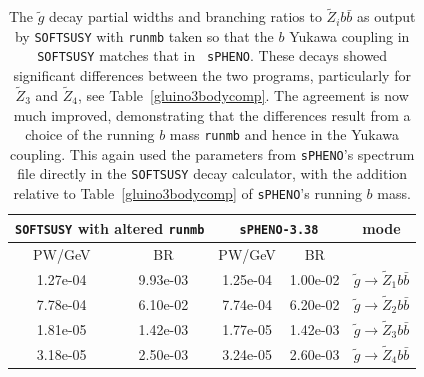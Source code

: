 \documentclass[final,3p,times,pdflatex]{elsarticle}
\def\code#1{{\tt #1}}
\begin{document}
\begin{center}
\begin{table}
\centering
\begin{tabular}{|c|c|c|c|c|} \hline
\multicolumn{2}{|C{3.0cm}|}{{\tt SOFTSUSY} with altered {\tt runmb}} & \multicolumn{2}{C{3.0cm}|}{{\tt sPHENO-3.38}} & mode \\ \hline
PW/GeV & BR & PW/GeV & BR & \\ \hline
1.27e-04 & 9.93e-03 & 1.25e-04 & 1.00e-02 & $\tilde{g} \rightarrow \tilde{Z}_1 b \bar{b}$ \\ \hline
7.78e-04 & 6.10e-02 & 7.74e-04 & 6.20e-02 & $\tilde{g} \rightarrow \tilde{Z}_2 b \bar{b}$ \\ \hline
1.81e-05 & 1.42e-03 & 1.77e-05 & 1.42e-03 & $\tilde{g} \rightarrow \tilde{Z}_3 b \bar{b}$ \\ \hline
3.18e-05 & 2.50e-03 & 3.24e-05 & 2.60e-03 & $\tilde{g} \rightarrow \tilde{Z}_4 b \bar{b}$ \\  \hline
\end{tabular}
\caption{The $\tilde{g}$ decay partial widths and branching ratios to
  $\tilde{Z}_i b \bar{b}$ as output by {\tt SOFTSUSY} with \code{runmb} taken
  so that the $b$ Yukawa coupling in {\tt SOFTSUSY} matches that in {\tt
    sPHENO}. These decays showed significant differences between the two
  programs, particularly for $\tilde{Z}_3$ and $\tilde{Z}_4$, see
  Table~\ref{gluino3bodycomp}. The agreement is now much improved,
  demonstrating that the differences result from a choice of the running $b$
  mass \code{runmb} and hence in the Yukawa coupling. This again used the
  parameters from {\tt sPHENO}'s spectrum file directly in the {\tt SOFTSUSY}
  decay calculator, with the addition relative to Table~\ref{gluino3bodycomp}
  of {\tt sPHENO}'s running $b$ mass.} 
\label{glutoneutbbnewyuk}
\end{table}
\end{center}
\end{document}

